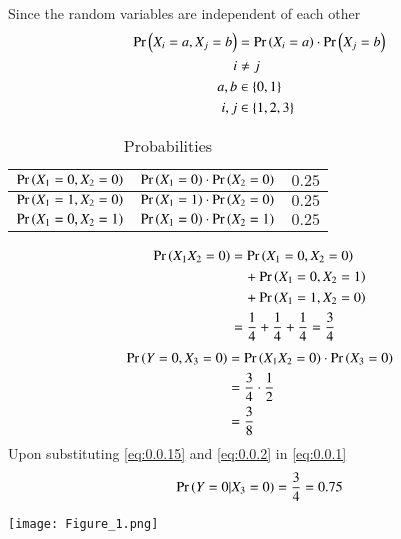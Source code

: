 \documentclass[journal,12pt,twocolumn]{IEEEtran}
\begin{document}
Since the random variables are independent of each other
\begin{align}
    \Pr\left(X_i = a, X_j = b\right) &= \Pr\left(X_i=a\right) \cdot \Pr\left(X_j=b\right)\\
    i &\neq j\\
    a,b &\in \{0,1\}\\
    i,j &\in \{1,2,3\}
\end{align}
\begin{table}[h!]
    \centering
    \resizebox{\columnwidth}{!}
    {
    \begin{tabular}{|c|c|c|}
    \hline
         $\Pr\left(X_1=0,X_2=0\right)$& $\Pr\left(X_1=0\right)\cdot\Pr\left(X_2=0\right)$&$0.25 $\\ \hline
         
         $\Pr\left(X_1=1,X_2=0\right)$&$\Pr\left(X_1=1\right)\cdot\Pr\left(X_2=0\right)$&$0.25$ \\  \hline
         $\Pr\left(X_1=0,X_2=1\right)$&$\Pr\left(X_1=0\right)\cdot\Pr\left(X_2=1\right)$&$0.25$\\
         \hline
    \end{tabular}
    }
    
    \caption{Probabilities }
    \label{tab:my_label}
\end{table}
\begin{align}
\nonumber
\Pr\left(X_1X_2=0\right) &= \Pr\left(X_1=0,X_2=0\right) \\ \nonumber
    &\quad+ \Pr\left(X_1=0,X_2=1\right)\\ &\quad+ \Pr\left(X_1=1,X_2=0\right)\\
    &=\frac{1}{4} +\frac{1}{4} + \frac{1}{4}= \frac{3}{4} 
\end{align}
\begin{align}
    \Pr\left(Y=0,X_3=0\right) &= \Pr\left(X_1X_2=0\right)\cdot\Pr\left(X_3=0\right)\\
    &=\frac{3}{4} \cdot \frac{1}{2}\\
    &=\frac{3}{8} \label{eq:0.0.15}
\end{align}
Upon substituting \eqref{eq:0.0.15} and \eqref{eq:0.0.2} in \eqref{eq:0.0.1}
\begin{align}
    \Pr\left(Y=0|X_3=0\right) = \dfrac{3}{4} = 0.75
\end{align}

\texttt{[image: Figure\_1.png]}
 
\end{document}

